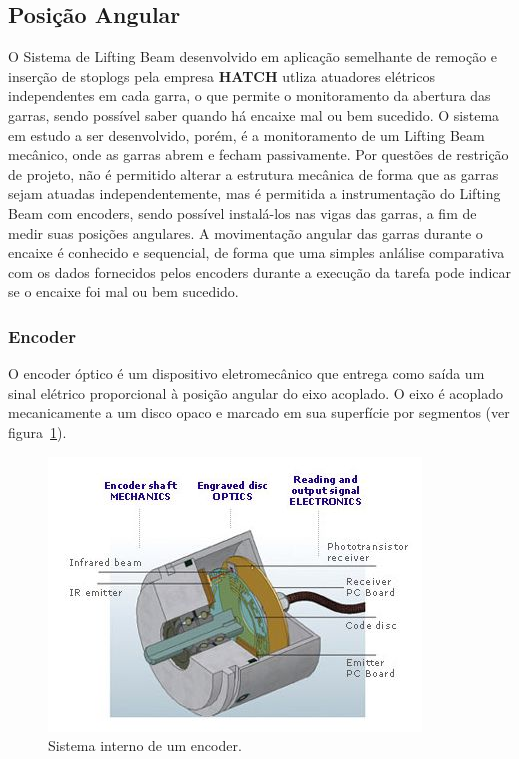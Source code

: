 


\subsection{Posição Angular}

O Sistema de Lifting Beam desenvolvido em aplicação semelhante de remoção e inserção de stoplogs pela empresa \textbf{HATCH} utliza atuadores elétricos independentes em cada garra, o que permite o monitoramento da abertura das garras, sendo possível saber quando há encaixe mal ou bem sucedido. O sistema em estudo a ser desenvolvido, porém, é a monitoramento de um Lifting Beam mecânico, onde as garras abrem e fecham passivamente. Por questões de restrição de projeto, não é permitido alterar a estrutura mecânica de forma que as garras sejam atuadas independentemente, mas é permitida a instrumentação do Lifting Beam com encoders, sendo possível instalá-los nas vigas das garras, a fim de medir suas posições angulares. A movimentação angular das garras durante o encaixe é conhecido e sequencial, de forma que uma simples anlálise comparativa com os dados fornecidos pelos encoders durante a execução da tarefa pode indicar se o encaixe foi mal ou bem sucedido.

\subsubsection{Encoder}
O encoder óptico é um dispositivo eletromecânico que entrega como saída um sinal elétrico proporcional à posição angular do eixo acoplado. O eixo é acoplado mecanicamente a um disco opaco e marcado em sua superfície por segmentos (ver figura~\ref{encoder_1}).

\begin{figure}[H]
    \centering
    \includegraphics[width=0.5\columnwidth]{figs/encoder/1.jpg}
    \caption{Sistema interno de um encoder.}
    \label{encoder_1}
\end{figure}

